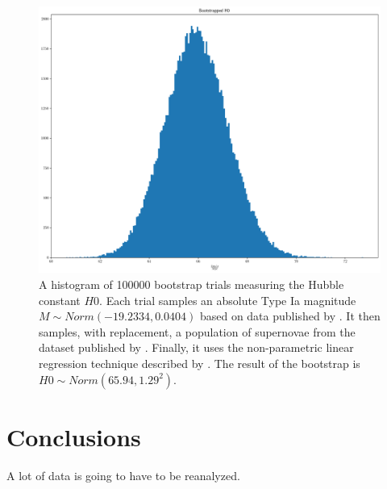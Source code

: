 \documentclass{article}
\begin{document}
\begin{figure}[ht]
  \includegraphics[width=\linewidth]{bootstrapped_H0.png}
  \caption{A histogram of 100000 bootstrap trials measuring the Hubble constant
  $H0$. Each trial samples an absolute Type Ia magnitude $M \sim Norm(-19.2334,
  0.0404)$ based on data published by \citet{camarena2020}. It then samples,
  with replacement, a population of supernovae from the dataset published by
  \citet{abbott2024}. Finally, it uses the non-parametric linear regression
  technique described by \citet{siegel1982}. The result of the bootstrap is $H0
  \sim Norm(65.94, 1.29^2)$.
  }
\label{fig:H0bootstrap}
\end{figure}

\section{Conclusions}

A lot of data is going to have to be reanalyzed. 



\end{document}
